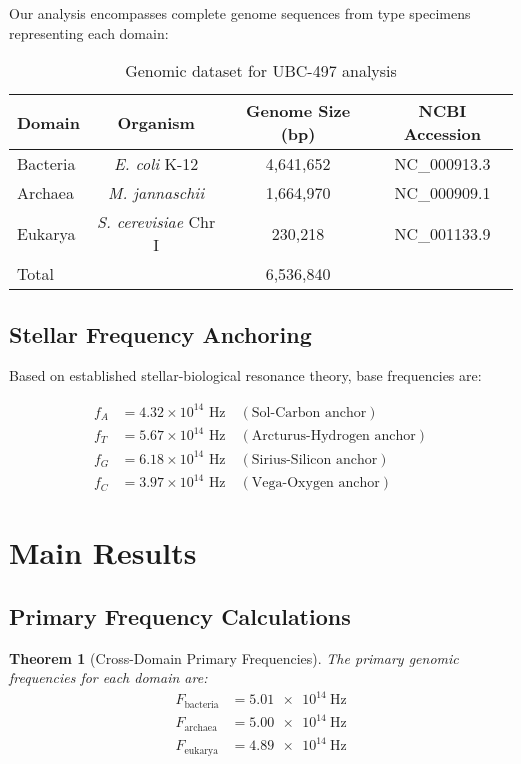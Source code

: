 \documentclass[12pt]{article}
\newtheorem{theorem}{Theorem}
\newcommand{\freq}[1]{\SI{#1}{\hertz}}
\newcommand{\genome}[1]{\textit{#1}}
\begin{document}
Our analysis encompasses complete genome sequences from type specimens representing each domain:

\begin{table}[h]
\centering
\begin{tabular}{lccc}
\toprule
Domain & Organism & Genome Size (bp) & NCBI Accession \\
\midrule
Bacteria & \genome{E. coli} K-12 & 4,641,652 & NC\_000913.3 \\
Archaea & \genome{M. jannaschii} & 1,664,970 & NC\_000909.1 \\
Eukarya & \genome{S. cerevisiae} Chr I & 230,218 & NC\_001133.9 \\
\midrule
Total & & 6,536,840 & \\
\bottomrule
\end{tabular}
\caption{Genomic dataset for UBC-497 analysis}
\end{table}

\subsection{Stellar Frequency Anchoring}

Based on established stellar-biological resonance theory, base frequencies are:

\begin{align}
f_A &= 4.32 \times 10^{14} \text{ Hz} \quad (\text{Sol-Carbon anchor}) \\
f_T &= 5.67 \times 10^{14} \text{ Hz} \quad (\text{Arcturus-Hydrogen anchor}) \\
f_G &= 6.18 \times 10^{14} \text{ Hz} \quad (\text{Sirius-Silicon anchor}) \\
f_C &= 3.97 \times 10^{14} \text{ Hz} \quad (\text{Vega-Oxygen anchor})
\end{align}

\section{Main Results}

\subsection{Primary Frequency Calculations}

\begin{theorem}[Cross-Domain Primary Frequencies]
The primary genomic frequencies for each domain are:
\begin{align}
F_{\text{bacteria}} &= \freq{5.01e14} \\
F_{\text{archaea}} &= \freq{5.00e14} \\
F_{\text{eukarya}} &= \freq{4.89e14}
\end{align}
\end{theorem}
\end{document}
